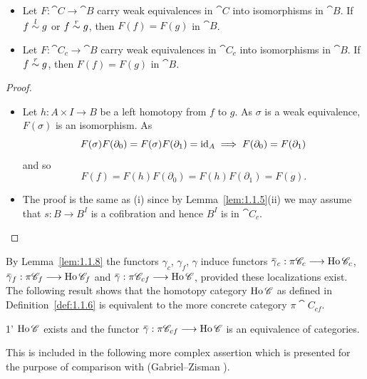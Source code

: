 \documentclass[../main]{subfiles}
\begin{document}
\begin{lemma}
\label{lem:1.1.8}
\begin{itemize}
    \item[(i)] Let $F : \cat C \longrightarrow \cat B$ carry weak equivalences in $\cat C$ into isomorphisms in $\cat B$. If $f \overset{l}{\sim} g$ or $f \overset{r}{\sim} g$, then $F(f) = F(g)$ in $\cat B$.
    \item[(ii)] Let $F : \cat C_c \longrightarrow \cat B$ carry weak equivalences in $\cat C_c$ into isomorphisms in $\cat B$. If $f \overset{r}{\sim} g$, then $F(f) = F(g)$ in $\cat B$. 
\end{itemize} 
\end{lemma} 

\begin{proof}
\begin{itemize}
    \item[(i)] Let $h : A \times I \longrightarrow B$ be a left homotopy from $f$ to $g$. As $\sigma$ is a weak equivalence, $F(\sigma)$ is an isomorphism. As \[F(\sigma) F(\partial_0) = F(\sigma) F(\partial_1) = \operatorname{id}_A\implies F(\partial_0) = F(\partial_1)\] and so \[F(f) = F(h) F(\partial_0) = F(h) F(\partial_1) = F(g).\]
    \item[(ii)] The proof is the same as (i) since by Lemma~\ref{lem:1.1.5}(ii) we may assume that $s : B \longrightarrow B^I$ is a cofibration and hence $B^I$ is in $\cat C_c$.
\end{itemize} 
\end{proof} 

By Lemma~\ref{lem:1.1.8} the functors $\gamma_c$, $\gamma_f$, $\gamma$ induce functors $\xoverline \gamma_c : \pi \cat C_c \longrightarrow \Ho \cat C_c$, $\xoverline \gamma_f : \pi \cat C_f \longrightarrow \Ho \cat C_f$ and $\xoverline \gamma : \pi \cat C_{cf} \longrightarrow \Ho \cat C$, provided these localizations exist. The following result shows that the homotopy category $\operatorname{Ho} \mathscr{C}$ as defined in Definition~\ref{def:1.1.6} is equivalent to the more concrete category $\pi \cat C_{cf}$.

\begin{customthm}{1'}\label{thm:1'}
$\operatorname{Ho} \mathscr{C}$ exists and the functor $\xoverline \gamma : \pi \cat C_{cf} \longrightarrow \Ho \cat C$ is an equivalence of categories. 
\end{customthm} 

This is included in the following more complex assertion which is presented for the purpose of comparison with (Gabriel--Zisman \cite{gabriel_calculus_1967}).
\end{document}
